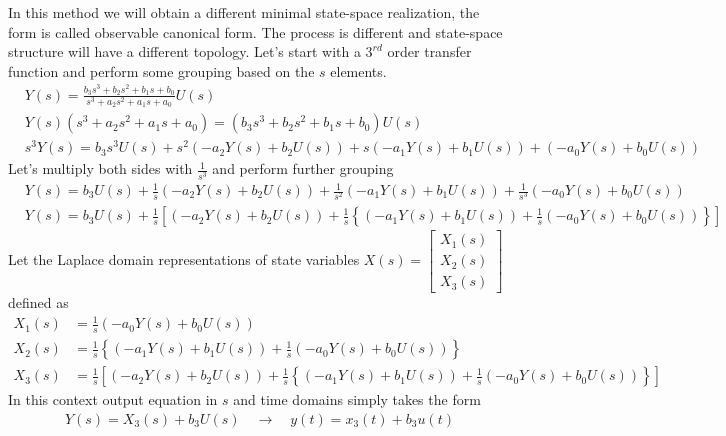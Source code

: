 \documentclass[twoside]{article}
\begin{document}
In this method we will obtain a different minimal state-space realization,
the form is called observable canonical form.
The process is different and state-space structure will have a
different topology. Let's start with a $3^{rd}$ order transfer function 
and perform some grouping based on the $s$ elements.
%
\begin{align*}
&Y(s) = \frac{ b_3 s^3 + b_2 s^2  + b_1 s + b_0 }{ s^3 + a_2 s^2 + a_1 s + a_0} U(s)
\\
&Y(s) \left( s^3 + a_2 s^2 + a_1 s + a_0 \right) = \left( b_3 s^3 + b_2 s^2  + b_1 s + b_0 \right) U(s)
\\
&s^3 Y(s) = b_3 s^3 U(s) + s^2 \left( -a_2 Y(s) + b_2 U(s) \right) + s \left( -a_1 Y(s) + b_1 U(s) \right) + 
\left( -a_0 Y(s) + b_0 U(s) \right) 
\end{align*}
%
Let's multiply both sides with $\frac{1}{s^3}$ and perform further grouping
%
\begin{align*}
&Y(s) = b_3 U(s) + \frac{1}{s} \left( -a_2 Y(s) + b_2 U(s) \right) + \frac{1}{s^2}  \left( -a_1 Y(s) + b_1 U(s) \right) + 
\frac{1}{s^3} \left( -a_0 Y(s) + b_0 U(s) \right) 
\\
&Y(s) = b_3 U(s) + \frac{1}{s} \left[ \left( -a_2 Y(s) + b_2 U(s) \right) + \frac{1}{s}  \left\lbrace \left( -a_1 Y(s) + b_1 U(s) \right) + 
\frac{1}{s} \left( -a_0 Y(s) + b_0 U(s) \right) \right\rbrace \right]
\end{align*}
%
Let the Laplace domain representations of state variables $X(s) = \left[ \begin{array}{c} X_1(s) \\ X_2(s) \\ X_3(s) \end{array} \right]$ defined as 
%
\begin{align*}
X_1(s) &= \frac{1}{s} \left( -a_0 Y(s) + b_0 U(s) \right)
\\
X_2(s) &= \frac{1}{s}  \left\lbrace \left( -a_1 Y(s) + b_1 U(s) \right) + 
\frac{1}{s} \left( -a_0 Y(s) + b_0 U(s) \right) \right\rbrace
\\
X_3(s) &= \frac{1}{s} \left[ \left( -a_2 Y(s) + b_2 U(s) \right) + \frac{1}{s}  \left\lbrace \left( -a_1 Y(s) + b_1 U(s) \right) + 
\frac{1}{s} \left( -a_0 Y(s) + b_0 U(s) \right) \right\rbrace \right]
\end{align*}
%
In this context output equation in $s$ and time domains simply takes the form
%
\begin{align*}
	Y(s) = X_3(s) + b_3 U(s) \quad \rightarrow \quad y(t) = x_3(t) + b_3 u(t)
\end{align*}
\end{document}
